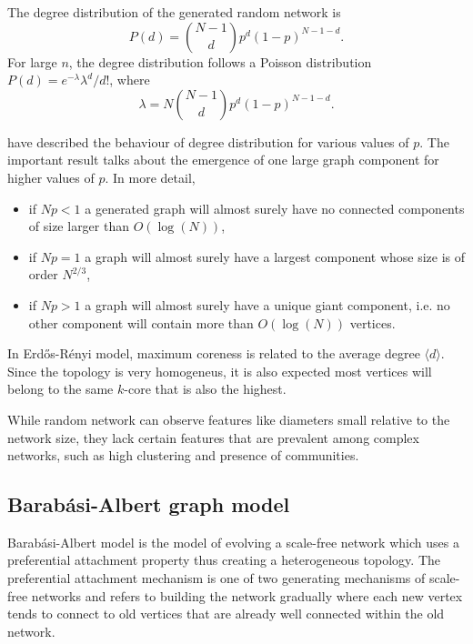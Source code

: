 \documentclass[times, utf8, diplomski]{fer}
\begin{document}
The degree distribution of the generated random network is 
\begin{equation}
P(d) = {{N - 1}\choose{d}}p^d (1 - p)^{N - 1 - d}.
\end{equation}
For large $n$, the degree distribution follows a Poisson distribution $P(d) = e ^{-\lambda}\lambda^d / d!$, where $$\lambda = N {{N - 1}\choose{d}} p^d (1 - p)^{N - 1 - d}.$$

\citet{Erdos1959} have described the behaviour of degree distribution for various values of $p$. The important result talks about the  emergence of one large graph component for higher values of $p$. In more detail,

\let\labelitemi\labelitemii
\begin{itemize}
\item{if $Np < 1$ a generated graph will almost surely have no connected components of size larger than $O(\log(N))$, } 
\item{if $Np = 1$ a graph will almost surely have a largest component whose size is of order $N^{2/3}$,}
\item{if $Np > 1$ a graph will almost surely have a unique giant component, i.e. no other component will contain more than $O(\log(N))$ vertices.}
\end{itemize}

In Erd{\H{o}}s-R{\'{e}}nyi model, maximum coreness is related to the average degree $\langle d \rangle$. Since the topology is very homogeneus, it is also expected most vertices will belong  to the same $k$-core that is also the highest. 

While random network can observe features like diameters small relative to the network size, they lack certain features that are prevalent among complex networks, such as  high clustering and presence of communities. 

\subsection{Barab\'{a}si-Albert graph model}

Barab\'{a}si-Albert model is the model of evolving a scale-free network  which uses a preferential attachment property thus creating a heterogeneous topology.  The preferential attachment mechanism is one of two generating mechanisms of scale-free networks \cite{Barabasi99emergenceof} and refers to building the network gradually where each new vertex tends to connect to old vertices that are already well connected within the old network.
\end{document}
